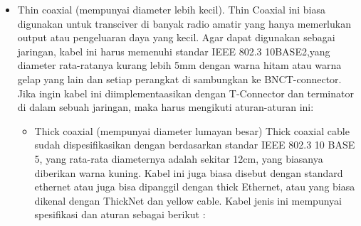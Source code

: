 \begin{itemize}
		\item Thin coaxial (mempunyai diameter lebih kecil). Thin Coaxial ini biasa digunakan untuk transciver di banyak radio amatir yang hanya memerlukan output atau pengeluaran daya yang kecil. Agar dapat digunakan sebagai jaringan, kabel ini harus memenuhi standar IEEE 802.3 10BASE2,yang diameter rata-ratanya kurang lebih 5mm dengan warna hitam atau warna gelap yang lain dan setiap perangkat di sambungkan ke BNCT-connector. Jika ingin kabel ini diimplementaasikan dengan T-Connector dan terminator di dalam sebuah jaringan, maka harus mengikuti aturan-aturan ini: 
			
	\begin{itemize}
		\item Thick coaxial (mempunyai diameter lumayan besar) Thick coaxial cable sudah dispesifikasikan dengan berdasarkan standar IEEE 802.3 10 BASE 5, yang rata-rata diameternya adalah sekitar 12cm, yang biasanya diberikan warna kuning. Kabel ini juga biasa disebut dengan standard ethernet atau juga bisa dipanggil dengan thick Ethernet, atau yang biasa dikenal dengan ThickNet dan yellow cable. Kabel jenis ini mempunyai spesifikasi dan aturan sebagai berikut :


\end{itemize}
\end{itemize}
